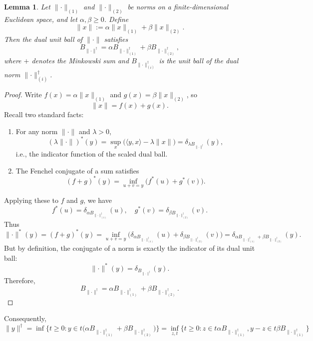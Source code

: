 \documentclass{article} %
\newtheorem{lemma}{Lemma}
\newcommand{\norm}[1]{\lVert #1\rVert}
\begin{document}
\begin{lemma}\label{lem:dual_to_conv_comb}
    Let $\norm{\cdot}_{(1)}$ and $\norm{\cdot}_{(2)}$ be norms on a finite-dimensional Euclidean space, and let $\alpha,\beta \geq 0$. Define 
    $$
    \norm{x} := \alpha \norm{x}_{(1)} + \beta \norm{x}_{(2)}.
    $$
    Then the dual unit ball of $\norm{\cdot}$ satisfies
    $$
    B_{\norm{\cdot}^\dagger} 
    = \alpha B_{\norm{\cdot}_{(1)}^\dagger} + \beta B_{\norm{\cdot}_{(2)}^\dagger},
    $$
    where $+$ denotes the Minkowski sum and $B_{\norm{\cdot}_{(i)}^\dagger}$ is the unit ball of the dual norm $\norm{\cdot}_{(i)}^\dagger$.
\end{lemma}
    
    \begin{proof}
    Write $f(x) = \alpha \norm{x}_{(1)}$ and $g(x) = \beta \norm{x}_{(2)}$, so 
    $$
    \norm{x} = f(x)+g(x).
    $$
    Recall two standard facts:
    \begin{enumerate}
        \item For any norm $\norm{\cdot}$ and $\lambda>0$, 
        $$
        (\lambda \norm{\cdot})^*(y) = 
        \sup_{x}\bigl( \langle y,x \rangle - \lambda \norm{x}\bigr)
        = \delta_{\lambda B_{\norm{\cdot}^\dagger}}(y),
        $$
        i.e., the indicator function of the scaled dual ball.
        \item The Fenchel conjugate of a sum satisfies
        $$
        (f+g)^*(y) = \inf_{u+v=y} \bigl(f^*(u) + g^*(v)\bigr).
        $$
    \end{enumerate}
    Applying these to $f$ and $g$, we have 
    $$
    f^*(u) = \delta_{\alpha B_{\norm{\cdot}_{(1)}^\dagger}}(u), 
    \quad 
    g^*(v) = \delta_{\beta B_{\norm{\cdot}_{(2)}^\dagger}}(v).
    $$
    Thus
    $$
    \norm{\cdot}^*(y) 
    = (f+g)^*(y)
    = \inf_{u+v=y}
    \bigl(
    \delta_{\alpha B_{\norm{\cdot}_{(1)}^\dagger}}(u)
    +
    \delta_{\beta B_{\norm{\cdot}_{(2)}^\dagger}}(v)
    \bigr)
    = 
    \delta_{\alpha B_{\norm{\cdot}_{(1)}^\dagger}+\beta B_{\norm{\cdot}_{(2)}^\dagger}}(y).
    $$
    But by definition, the conjugate of a norm is exactly the indicator of its dual unit ball:
    $$
    \norm{\cdot}^*(y) = \delta_{B_{\norm{\cdot}^\dagger}}(y).
    $$
    Therefore,
    $$
    B_{\norm{\cdot}^\dagger} = \alpha B_{\norm{\cdot}_{(1)}^\dagger} + \beta B_{\norm{\cdot}_{(2)}^\dagger}.
    $$
    \end{proof}

Consequently,
\begin{equation}\label{eq:dual_to_conv_comb}
\norm{y}^\dagger
= \inf\bigl\{ t \ge 0 : y \in t\bigl(\alpha B_{\norm{\cdot}_{(1)}^\dagger} + \beta B_{\norm{\cdot}_{(2)}^\dagger}\bigr) \bigr\}
= \inf_{z,t}\bigl\{t \ge 0: z \in t \alpha B_{\norm{\cdot}_{(1)}^\dagger}, y - z \in t \beta B_{\norm{\cdot}_{(1)}^\dagger}\bigr\}
\end{equation}
\end{document}
